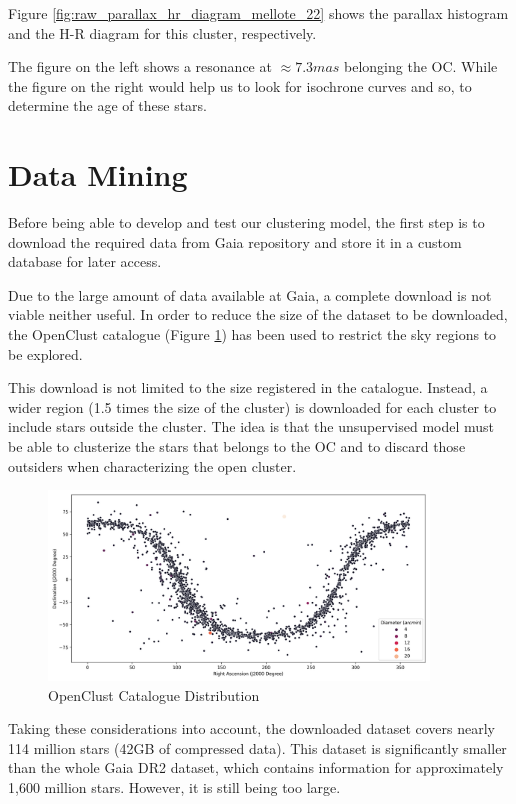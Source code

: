 \documentclass[11pt, a4paper, english]{book}
\begin{document}
Figure \ref{fig:raw_parallax_hr_diagram_mellote_22} shows the parallax histogram and the H-R diagram for this cluster, respectively.

The figure on the left shows a resonance at $\approx 7.3mas$ belonging the OC. While the figure on the right would help us to look for isochrone curves and so,
to determine the age of these stars.

\section{Data Mining}
\label{sec:data_mining}

Before being able to develop and test our clustering model, the first step is to download the required data from Gaia repository
and store it in a custom database for later access.

Due to the large amount of data available at Gaia, a complete download is not viable neither useful.
In order to reduce the size of the dataset to be downloaded, the OpenClust catalogue \cite{dias2002new} (Figure \ref{fig:OpenClustComplete})
has been used to restrict the sky regions to be explored.

This download is not limited to the size registered in the catalogue.
Instead, a wider region (1.5 times the size of the cluster) is downloaded for each cluster to include stars outside the cluster.
The idea is that the unsupervised model must be able to clusterize the stars that belongs to the OC and to discard
those outsiders when characterizing the open cluster.

\begin{figure}[htbp]
  \centering
  \includegraphics[width=0.9\textwidth]{../figures/openclust_catalogue.png}
  \caption{OpenClust Catalogue Distribution}
  \label{fig:OpenClustComplete}
\end{figure}

Taking these considerations into account, the downloaded dataset covers nearly 114 million stars (42GB of compressed data). This dataset is significantly
smaller than the whole Gaia DR2 dataset, which contains information for approximately 1,600 million stars. However, it is still being too large.
\end{document}
